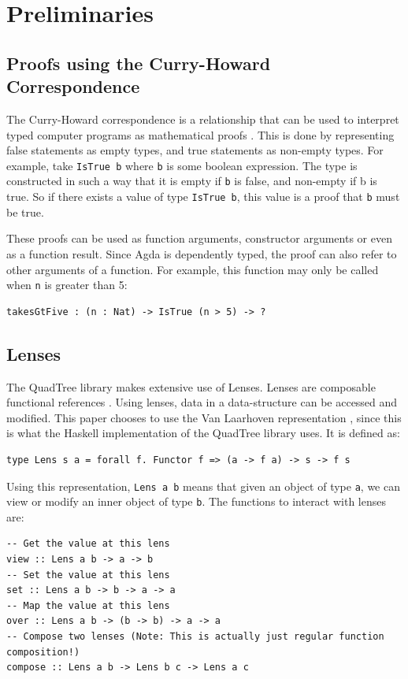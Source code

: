 \section{Preliminaries}
\subsection{Proofs using the Curry-Howard Correspondence}
The Curry-Howard correspondence is a relationship that can be used to interpret typed computer programs as mathematical proofs \cite{chc}. This is done by representing false statements as empty types, and true statements as non-empty types. For example, take  \verb|IsTrue b|  where  \verb|b| is some boolean expression. The type is constructed in such a way that it is empty if  \verb|b| is false, and non-empty if b is true.  So if there exists a value of type  \verb|IsTrue b|, this value is a proof that  \verb|b| must be true. 

These proofs can be used as function arguments, constructor arguments or even as a function result. Since Agda is dependently typed, the proof can also refer to other arguments of a function. For example, this function may only be called when \verb|n| is greater than 5:
\begin{verbatim}
takesGtFive : (n : Nat) -> IsTrue (n > 5) -> ?
\end{verbatim}

\subsection{Lenses}
The QuadTree library makes extensive use of Lenses. Lenses are composable functional references \cite{lens}. Using lenses, data in a data-structure can be accessed and modified. This paper chooses to use the Van Laarhoven representation \cite{laarhovenlens}, since this is what the Haskell implementation of the QuadTree library uses. It is defined as:
\begin{verbatim}
type Lens s a = forall f. Functor f => (a -> f a) -> s -> f s
\end{verbatim}
Using this representation, \verb|Lens a b| means that given an object of type \verb|a|, we can view or modify an inner object of type \verb|b|.
The functions to interact with lenses are:
\begin{verbatim}
-- Get the value at this lens
view :: Lens a b -> a -> b
-- Set the value at this lens
set :: Lens a b -> b -> a -> a
-- Map the value at this lens
over :: Lens a b -> (b -> b) -> a -> a
-- Compose two lenses (Note: This is actually just regular function composition!)
compose :: Lens a b -> Lens b c -> Lens a c
\end{verbatim}

